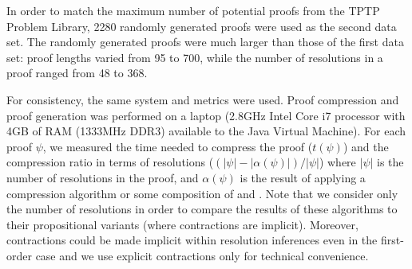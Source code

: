 {In order to match the maximum number of potential proofs from the TPTP Problem Library, 2280 randomly generated proofs were used as the second data set. The randomly generated proofs were much larger than those of the first data set: proof lengths varied from 95 to 700, while the number of resolutions in a proof ranged from 48 to 368.

For consistency, the same system and metrics were used. Proof compression and proof generation was performed on a laptop (2.8GHz Intel Core i7 processor with 4GB of RAM (1333MHz DDR3) available to the Java Virtual Machine). For each proof $\psi$, we measured the time needed to compress the proof ($t(\psi)$) and the compression ratio in terms of resolutions ($(|\psi|-|\alpha(\psi)|)/|\psi|$) where $|\psi|$ is the number of resolutions in the proof, and $\alpha(\psi)$ is the result of applying a compression algorithm or some composition of {\FORPI} and {\GFOLU}. Note that we consider only the number of resolutions in order to compare the results of these algorithms to their propositional variants (where contractions are implicit). Moreover, contractions could be made implicit within resolution inferences even in the first-order case and we use explicit contractions only for technical convenience.



}
